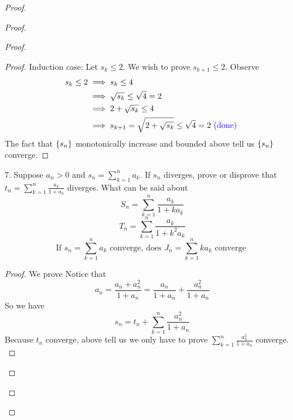 \documentclass{report}
\begin{document}
\begin{proof}
\begin{proof}
\begin{proof}
\begin{proof}
Induction case: Let $s_k\leq 2$. We wish to prove  $s_{k+1}\leq 2$. Observe
\begin{align}
  s_k\leq 2&\implies s_k\leq 4\\
  &\implies \sqrt{s_k}\leq \sqrt{4} =2\\
  &\implies 2+\sqrt{s_k} \leq 4\\
  &\implies s_{k+1}=\sqrt{2+\sqrt{s_k} }\leq \sqrt{4}=2 \textcolor{blue}{\text{ (done) }}
\end{align}
The fact that $\{ s_n \}$ monotonically increase and bounded above tell us $\{ s_n \}$ converge.
\end{proof}
\begin{question}{}{}
7. Suppose $a_n > 0$ and $s_n = \sum _{k=1}^{n} a_k$. If $s_n$ diverges, prove or disprove that $t_n=\sum_{k=1}^{n} \frac{a_k}{1+a_k}$ diverges. What can be said about
\begin{equation}
S_n=\sum_{k=1}^n \frac{a_k}{1+ka_k}
\end{equation}
\begin{equation}
T_n=\sum_{k=1}^n \frac{a_k}{1+k^2a_k}
\end{equation}
\begin{equation}
\text{If } s_n=\sum_{k=1}^n a_k\text{ converge, does }J_n=\sum_{k=1}^n ka_k\text{ converge }
\end{equation}
\end{question}
\begin{proof}
  We prove 
Notice that
\begin{equation}
a_n=\frac{a_n+a_n^2}{1+a_n}=\frac{a_n}{1+a_n}+\frac{a_n^2}{1+a_n}
\end{equation}
So we have
\begin{equation}
s_n=t_n+\sum_{k=1}^n \frac{a_n^2}{1+a_n}
\end{equation}
Because $t_n$ converge, above tell us we only have to prove  $\sum_{k=1}^n \frac{a_n^2}{1+a_n}$ converge.\\


\end{proof}
\end{proof}
\end{proof}
\end{proof}
\end{document}
